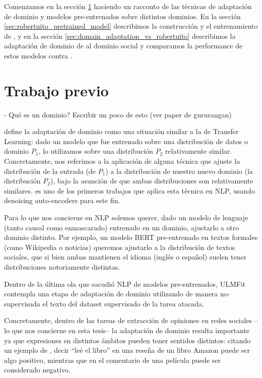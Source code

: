 Comenzamos en la sección \ref{sec:domain_adaptation_previous_work} haciendo un racconto de las técnicas de adaptación de dominio y modelos pre-entrenados sobre distintos dominios. En la sección \ref{sec:robertuito_pretrained_model} describimos la construcción y el entrenamiento de \robertuito{}, y en la sección \ref{sec:domain_adaptation_vs_robertuito} describimos la adaptación de dominio de \beto{} al dominio social y comparamos la performance de estos modelos contra \robertuito{}.

\section{Trabajo previo}
\label{sec:domain_adaptation_previous_work}

- Qué es un dominio? Escribir un poco de esto (ver paper de gururangan)

\citet{goodfellow2016deep} define la adaptación de dominio como una situación similar a la de Transfer Learning: dado un modelo que fue entrenado sobre una distribución de datos o dominio $P_1$, lo utilizamos sobre una distribución $P_2$ relativamente similar. Concretamente, nos referimos a la aplicación de alguna técnica que ajuste la distribución de la entrada (de $P_1$) a la distribución de nuestro nuevo dominio (la distribución $P_2$), bajo la asunción de que ambas distribuciones son relativamente similares. \citet{glorot2011domain} es uno de los primeros trabajos que aplica esta técnica en NLP, usando denoising auto-encoders para este fin. 

Para lo que nos concierne en NLP solemos querer, dado un modelo de lenguaje (tanto causal como enmascarado) entrenado en un dominio, ajustarlo a otro dominio distinto. Por ejemplo, un modelo BERT pre-entrenado en textos formales (como Wikipedia o noticias) queremos ajustarlo a la distribución de textos sociales, que si bien ambas mantienen el idioma (inglés o español) suelen tener distribuciones notoriamente distintas.

Dentro de la última ola que sacudió NLP de modelos pre-entrenados, ULMFit \citet{howard-ruder-2018-universal} contempla una etapa de adaptación de dominio utilizando de manera no-supervisada el texto del dataset supervisado de la tarea atacada.

Concretamente, dentro de las tareas de extracción de opiniones en redes sociales --lo que nos concierne en esta tesis-- la adaptación de dominio resulta importante ya que expresiones en distintos ámbitos pueden tener sentidos distintos: citando un ejemplo de \citet{pang2008opinion}, decir ``leé el libro'' en una reseña de un libro Amazon puede ser algo positivo, mientras que en el comentario de una película puede ser considerado negativo.

